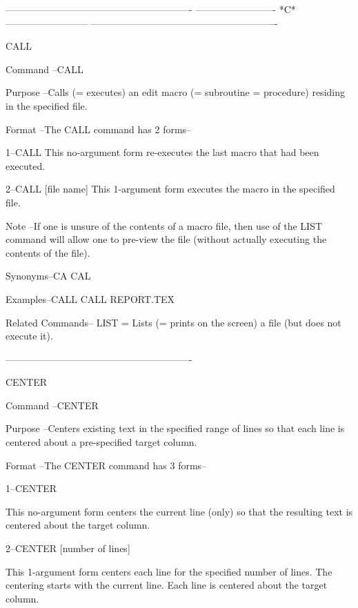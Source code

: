  
 
 
 
 
 
 
 
 
 
----------------------------------------------------------
-------------------------  *C*  --------------------------
----------------------------------------------------------
 
CALL
 
Command --CALL
 
Purpose --Calls (= executes) an edit macro
          (= subroutine = procedure)
          residing in the specified file.
 
Format  --The CALL command has 2 forms--
 
       1--CALL
          This no-argument form re-executes
          the last macro that had been executed.
 
       2--CALL    [file name]
          This 1-argument form executes the
          macro in the specified file.
 
Note    --If one is unsure of the contents
          of a macro file, then use of the LIST
          command will allow one to pre-view
          the file (without actually executing
          the contents of the file).
 
Synonyms--CA
          CAL
 
Examples--CALL
          CALL REPORT.TEX
 
Related Commands--
          LIST            = Lists (= prints on the screen)
                            a file (but does not execute it).
 
----------------------------------------------------------
 
CENTER
 
Command --CENTER
 
Purpose --Centers existing text in the specified range
          of lines so that each line is centered about
          a pre-specified target column.
 
Format  --The CENTER command has 3 forms--
 
       1--CENTER
 
          This no-argument form centers the current
          line (only) so that the resulting text
          is centered about the target column.
 
       2--CENTER     [number of lines]
 
          This 1-argument form centers each line
          for the specified number of lines.  The
          centering starts with the current line.
          Each line is centered about the target column.
 
